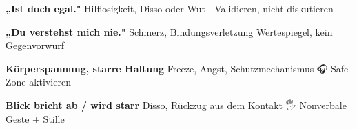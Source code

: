 {{{{\textbf{„Ist doch egal."}                                                                                                       Hilflosigkeit, Disso oder Wut                                                                                              💬 Validieren, nicht diskutieren

\textbf{„Du verstehst mich nie."}                                                                                               Schmerz, Bindungsverletzung                                                                                                \textcolor{ctmmPurple}{} Wertespiegel, kein Gegenvorwurf

\textbf{Körperspannung, starre Haltung}                                                                                         Freeze, Angst, Schutzmechanismus                                                                                           🎧 Safe-Zone aktivieren

\textbf{Blick bricht ab / wird starr}                                                                                           Disso, Rückzug aus dem Kontakt                                                                                             🖐️ Nonverbale Geste + Stille

}}}}

